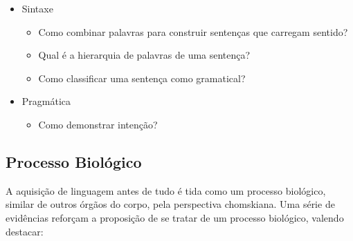 \begin{itemize}
 \item Sintaxe
 	 \begin{itemize}
		\item Como combinar palavras para construir sentenças que carregam sentido?
		\item Qual é a hierarquia de palavras de uma sentença?
		\item Como classificar uma sentença como gramatical?
 	\end{itemize}
 \end{itemize}

 \begin{itemize}
 \item Pragmática
 	 \begin{itemize}
		\item Como demonstrar intenção?
 	\end{itemize}
 \end{itemize}

\subsection{Processo Biológico}
\label{sec:processobiologico}

A aquisição de linguagem antes de tudo é tida como um processo biológico, similar de outros órgãos do corpo, pela perspectiva chomskiana. Uma série de evidências reforçam a proposição de se tratar de um processo biológico, valendo destacar:

